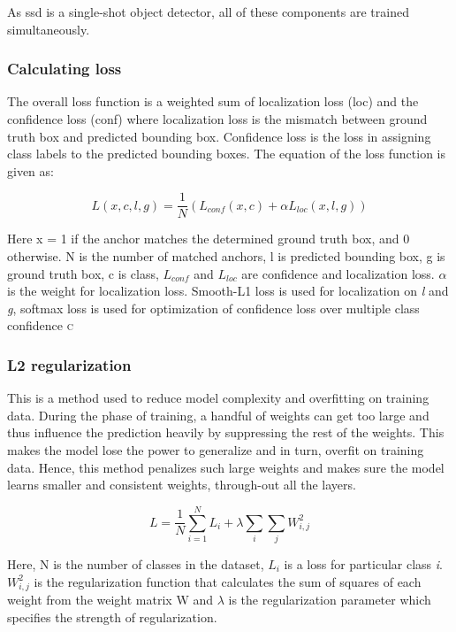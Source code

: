 As \ac{ssd} is a single-shot object detector, all of these components are trained simultaneously. 

\subsubsection{Calculating loss}

The overall loss function is a weighted sum of localization loss (loc) and the confidence loss (conf) where localization loss is the mismatch between ground truth box and predicted bounding box. Confidence loss is the loss in assigning class labels to the predicted bounding boxes. The equation of the loss function is given as: 

\begin{equation}
    L(x,c,l,g) = \frac{1}{N} (L_{conf} (x,c) + \alpha L_{loc} (x,l,g))
\end{equation}

Here x = 1 if the anchor matches the determined ground truth box, and 0 otherwise. N is the number of matched anchors, l is predicted bounding box, g is ground truth box, c is class, $L_{conf}$ and $L_{loc}$ are confidence and localization loss. $\alpha$ is the weight for localization loss. Smooth-L1 loss \cite{Girshick_2015_ICCV} is used for localization on \textit{l} and \textit{g}, softmax loss is used for optimization of confidence loss over multiple class confidence \textsc{c}

\subsubsection{L2 regularization}

This is a method used to reduce model complexity and overfitting on training data. During the phase of training, a handful of weights can get too large and thus influence the prediction heavily by suppressing the rest of the weights. This makes the model lose the power to generalize and in turn, overfit on training data. Hence, this method penalizes such large weights and makes sure the model learns smaller and consistent weights, through-out all the layers. 

\begin{equation}
    L = \frac{1}{N} \sum_{i=1}^{N} L_{i} + \lambda  \sum_{i} \sum_{j} W_{i,j}^2
\end{equation}

Here, N is the number of classes in the dataset, $L_{i}$ is a loss for particular class \textit{i}. 
$W_{i,j}^2$ is the regularization function that calculates the sum of squares of each weight from the weight matrix W and $\lambda$ is the regularization parameter which specifies the strength of regularization.


